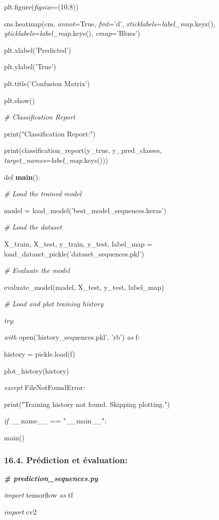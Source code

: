 \documentclass[
]{article}
\begin{document}
plt.figure(\emph{figsize}=(10,8))

sns.heatmap(cm, \emph{annot}=True, \emph{fmt}='d', \emph{xticklabels}=\emph{label\_map}.keys(), \emph{yticklabels}=\emph{label\_map}.keys(), \emph{cmap}='Blues')

plt.xlabel('Predicted')

plt.ylabel('True')

plt.title('Confusion Matrix')

plt.show()

\emph{\# Classification Report}

print("Classification Report:")

print(classification\_report(y\_true, y\_pred\_classes, \emph{target\_names}=\emph{label\_map}.keys()))

def \textbf{main}():

\emph{\# Load the trained model}

model = load\_model('best\_model\_sequences.keras')

\emph{\# Load the dataset}

X\_train, X\_test, y\_train, y\_test, label\_map = load\_dataset\_pickle('dataset\_sequences.pkl')

\emph{\# Evaluate the model}

evaluate\_model(model, X\_test, y\_test, label\_map)

\emph{\# Load and plot training history}

\emph{try}:

\emph{with} open('history\_sequences.pkl', 'rb') \emph{as} f:

history = pickle.load(f)

plot\_history(history)

\emph{except} FileNotFoundError:

print("Training history not found. Skipping plotting.")

\emph{if} \_\_name\_\_ == "\_\_main\_\_":

main()

\hypertarget{pruxe9diction-et-uxe9valuation}{%
\subsubsection{16.4. Prédiction et évaluation:}\label{pruxe9diction-et-uxe9valuation}}

\emph{\textbf{\# prediction\_sequences.py}}

\emph{import} tensorflow \emph{as} tf

\emph{import} cv2
\end{document}
